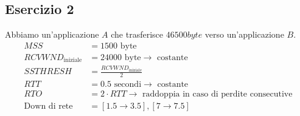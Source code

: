 \documentclass[a4paper]{article}
\begin{document}
\subsection{Esercizio 2}
Abbiamo un'applicazione \( A \) che trasferisce \( 46500byte \) verso un'applicazione \( B \).
\[
\begin{aligned}
  MSS &= 1500 \text{ byte}\\
  RCVWND_{\text{iniziale}} &= 24000 \text{ byte} \to \text{ costante}\\
  SSTHRESH &= \frac{RCVWND_{\text{iniziale}}}{2}\\
  RTT &= 0.5 \text{ secondi} \to \text{ costante}\\
  RTO &= 2 \cdot RTT \to \text{ raddoppia in caso di perdite consecutive}\\
  \text{Down di rete} &= [1.5 \to 3.5],[7 \to 7.5]
\end{aligned}
\] 
\end{document}
